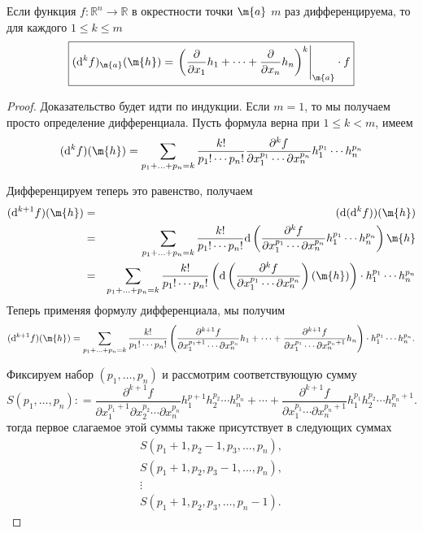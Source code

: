 \begin{theorem}\label{differential_formula}
    Если функция $f:\mathbb{R}^n \to \mathbb{R}$ в окрестности точки $\m{a}$ $m$ раз дифференцируема, то для каждого $1 \le k \le m$
    \[
     \boxed{
 (\mathrm{d}^kf)_\m{a}(\m{h})=     \left.\left(\frac{\partial}{\partial x_1} h_1 + \cdots + \frac{\partial }{\partial x_n}h_n \right)^k\right|_{\m{a}} \cdot f
    }\]
\end{theorem}
\begin{proof}
    Доказательство будет идти по индукции. Если $m=1$, то мы получаем просто определение дифференциала. Пусть формула верна при $1 \le k<m$, имеем
    \[
     (\mathrm{d}^kf)(\m{h}) = \sum_{p_1 + \ldots + p_n = k} \dfrac{k!}{p_1! \cdots p_n!} \frac{\partial^k f}{\partial x_1^{p_1} \cdots \partial x_n^{p_n}} h_1^{p_1}\cdots h_n^{p_n}
    \]

Дифференцируем теперь это равенство, получаем
\begin{eqnarray*}
    (\mathrm{d}^{k+1}f)(\m{h}) &=& (\mathrm{d}(\mathrm{d}^kf))(\m{h}) \\
     &=& \sum_{p_1 + \ldots + p_n = k} \dfrac{k!}{p_1! \cdots p_n!} \mathrm{d}\left( \frac{\partial^k f}{\partial x_1^{p_1} \cdots \partial x_n^{p_n}} h_1^{p_1}\cdots h_n^{p_n}\right) \m{h}\\
     &=& \sum_{p_1 + \ldots + p_n = k} \dfrac{k!}{p_1! \cdots p_n!} \left(\mathrm{d}\left( \frac{\partial^k f}{\partial x_1^{p_1} \cdots \partial x_n^{p_n}} \right)(\m{h}) \right)\cdot h_1^{p_1}\cdots h_n^{p_n} 
\end{eqnarray*}
    Теперь применяя формулу дифференциала, мы получим
\[
  (\mathrm{d}^{k+1}f)(\m{h}) = \sum_{p_1 + \ldots + p_n = k} \dfrac{k!}{p_1! \cdots p_n!} \left( \frac{\partial^{k+1}f}{\partial x_1^{p_1+1} \cdots \partial x_n^{p_n}}h_1 + \cdots +  \frac{\partial^{k+1}f}{\partial x_1^{p_1} \cdots \partial x_n^{p_n+1}}h_n \right)\cdot h_1^{p_1}\cdots h_n^{p_n}. 
\]

Фиксируем набор $(p_1,\ldots, p_n)$ и рассмотрим соответствующую сумму
\[
 S(p_1,\ldots, p_n): = \frac{\partial^{k+1}f}{\partial x_1^{p_1+1} \partial x_2^{p_2} \cdots \partial x_n^{p_n}}h_1^{p+1}h_2^{p_2}\cdots h_n^{p_n} + \cdots +  \frac{\partial^{k+1}f}{\partial x_1^{p_1} \cdots \partial x_n^{p_n+1}}h_1^{p_1}h_2^{p_2} \cdots h_n^{p_n+1}.
\]
тогда первое слагаемое этой суммы также присутствует в следующих суммах
\[
\begin{matrix}
    S(p_1+1, p_2-1,p_3,\ldots, p_n), \\
    S(p_1+1, p_2,p_3-1,\ldots, p_n), \\
    \vdots \\
    S(p_1+1, p_2,p_3,\ldots, p_n-1).
\end{matrix}
\]


\end{proof}
